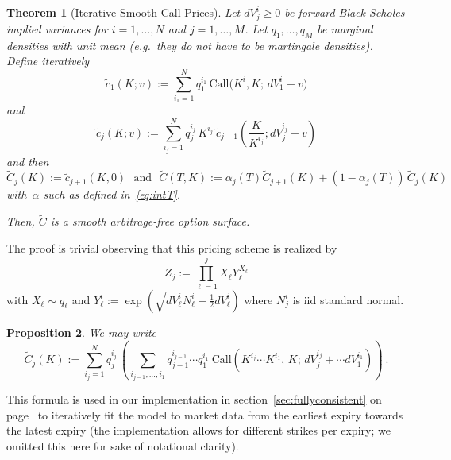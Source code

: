 \documentclass[twoside]{article}
\theoremstyle{plain}
\newtheorem{theorem}{Theorem}[section]        %
\newtheorem{proposition}[theorem]{Proposition}
\theoremstyle{definition}
\theoremstyle{remark}
\begin{document}
\begin{theorem}[Iterative Smooth Call Prices]\label{th:fullsmooth}
    Let $dV_j^i\geq 0$ be forward Black-Scholes implied variances for $i=1,\ldots,N$
    and $j=1,\ldots,M$. Let $q_1,\ldots,q_M$ be marginal densities
    with unit mean (e.g.~they do not have
    to be martingale densities). Define iteratively
    \begin{equation}\label{eq:tildeC1}
        \tilde c_1(K;v) := \sum_{i_1=1}^N q_1^{i_1}\, \mathrm{Call}\big( K^i, K;\,dV_1^i + v\big)
    \end{equation}
    and
    \begin{equation}\label{eq:tildeC1j}
        \tilde c_j(K; v) := \sum_{i_j=1}^N q_j^{i_j}\, K^{i_j}\ \tilde c_{j-1}\!\left(\frac{K}{K^{i_j}}; dV^{i_j}_j + v\right) 
    \end{equation}
    and then
    \begin{equation}\label{eq:tildeCTK}
        \tilde C_j(K) := \tilde c_{j+1}(K,0) \ \ \ \mbox{and} \ \ \
        \tilde C(T,K) := \alpha_j(T) \tilde C_{j+1}(K) + (1-\alpha_j(T))\, \tilde C_j(K) 
    \end{equation}
    with~$\alpha$ such as defined in~\eqref{eq:intT}.

    Then, $\tilde C$ is a smooth arbitrage-free option surface.    
\end{theorem}
\noindent
The proof is trivial observing that this pricing scheme 
is realized by
\begin{equation}\label{eq:Zcomplex}
    Z_j := \prod_{\ell=1}^j X_\ell Y_\ell^{X_\ell}
\end{equation}
with $X_\ell\sim q_\ell$
and $Y_\ell^i := \exp\left( \sqrt{ dV_\ell^i } N_\ell^i - \mbox{$\frac12$} dV_\ell^i \right)$
where $N_j^i$ is iid standard normal.



\begin{proposition}
    We may write
    \begin{equation}\label{eq:complexmodelit}
        \tilde C_j(K) := \sum_{i_j=1}^N q_j^{i_j}\,
        \left( \sum_{i_{j-1},\ldots,i_1} q^{i_{j-1}}_{j-1} \cdots q^{i_1}_1
        \ \mathrm{Call}\!\left(K^{i_j} \cdots K^{i_1},\, K;\, dV^{i_j}_j+\cdots dV^{i_1}_1 \right) 
        \right) \ .
    \end{equation}
\end{proposition}
\noindent
This formula is used in our implementation in section~\ref{sec:fullyconsistent}
on page~\pageref{sec:fullyconsistent} to iteratively fit the model to 
market data from the earliest expiry towards the latest expiry (the implementation allows
for different strikes per expiry; we omitted this here for sake of notational clarity).
\end{document}
